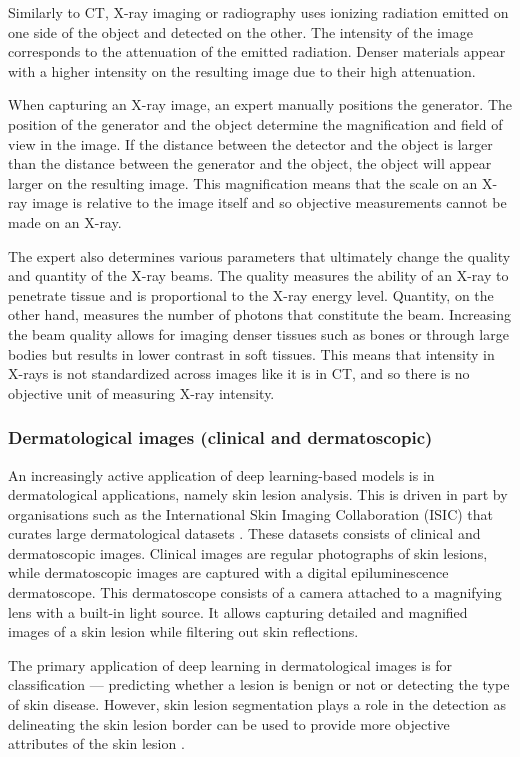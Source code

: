 Similarly to CT, X-ray imaging or radiography uses ionizing radiation emitted on one side of the object and detected on the other. The intensity of the image corresponds to the attenuation of the emitted radiation. Denser materials appear with a higher intensity on the resulting image due to their high attenuation.

When capturing an X-ray image, an expert manually positions the generator. The position of the generator and the object determine the magnification and field of view in the image. If the distance between the detector and the object is larger than the distance between the generator and the object, the object will appear larger on the resulting image. This magnification means that the scale on an X-ray image is relative to the image itself and so objective measurements cannot be made on an X-ray.

The expert also determines various parameters that ultimately change the quality and quantity of the X-ray beams. The quality measures the ability of an X-ray to penetrate tissue and is proportional to the X-ray energy level. Quantity, on the other hand, measures the number of photons that constitute the beam. Increasing the beam quality allows for imaging denser tissues such as bones or through large bodies but results in lower contrast in soft tissues. This means that intensity in X-rays is not standardized across images like it is in CT, and so there is no objective unit of measuring X-ray intensity.

\subsubsection{Dermatological images (clinical and dermatoscopic)}

An increasingly active application of deep learning-based models is in dermatological applications, namely skin lesion analysis. This is driven in part by organisations such as the International Skin Imaging Collaboration (ISIC) that curates large dermatological datasets \cite{rotembergPatientcentricDatasetImages2021}. These datasets consists of clinical and dermatoscopic images. Clinical images are regular photographs of skin lesions, while dermatoscopic images are captured with a digital epiluminescence dermatoscope. This dermatoscope consists of a camera attached to a magnifying lens with a built-in light source. It allows capturing detailed and magnified images of a skin lesion while filtering out skin reflections.

The primary application of deep learning in dermatological images is for classification --- predicting whether a lesion is benign or not or detecting the type of skin disease. However, skin lesion segmentation plays a role in the detection as delineating the skin lesion border can be used to provide more objective attributes of the skin lesion \cite{rotembergPatientcentricDatasetImages2021}.

